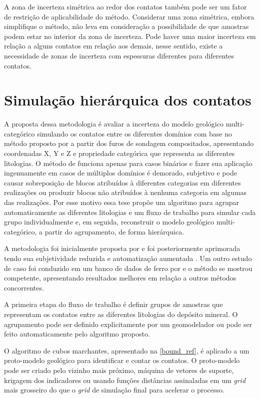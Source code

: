 A zona de incerteza simétrica ao redor dos contatos também pode ser um fator de restrição de aplicabilidade do método. Considerar uma zona simétrica, embora simplifique o método, não leva em consideração a possibilidade de que amostras podem estar no interior da zona de incerteza. Pode haver uma maior incerteza em relação a alguns contatos em relação aos demais, nesse sentido, existe a necessidade de zonas de incerteza com espessuras diferentes para diferentes contatos.

\section{Simulação hierárquica dos contatos}

A proposta dessa metodologia é avaliar a incerteza do modelo geológico multi-categórico simulando os contatos entre os diferentes domínios com base no método proposto por  a partir dos furos de sondagem compositados, apresentando coordenadas X, Y e Z e propriedade categórica que representa as diferentes litologias. O método de  funciona apenas para casos binários e fazer sua aplicação ingenuamente em casos de múltiplos domínios é demorado, subjetivo e pode causar sobreposição de blocos atribuídos à diferentes categorias em diferentes realizações ou produzir blocos não atribuídos à nenhuma categoria em algumas das realizações. Por esse motivo essa tese propõe um algoritmo para agrupar automaticamente as diferentes litologias e um fluxo de trabalho para simular cada grupo individualmente e, em seguida, reconstruir o modelo geológico multi-categórico, a partir do agrupamento, de forma hierárquica. 

A metodologia foi inicialmente proposta por  e foi posteriormente aprimorada tendo sua subjetividade reduzida e automatização aumentada \cite{amarante2021boundary}. Um outro estudo de caso foi conduzido em um banco de dados de ferro por  e o método se mostrou competente, apresentando resultados melhores em relação a outros métodos concorrentes.

A primeira etapa do fluxo de trabalho é definir grupos de amostras que representam os contatos entre as diferentes litologias do depósito mineral. O agrupamento pode ser definido explicitamente por um geomodelador ou pode ser feito automaticamente pelo algoritmo proposto.

O algoritmo de cubos marchantes, apresentado na \autoref{bound_ref}, é aplicado a um proto-modelo geológico para identificar e contar os contatos. O proto-modelo pode ser criado pelo vizinho mais próximo, máquina de vetores de suporte, krigagem dos indicadores ou usando funções distâncias assinaladas em um \textit{grid} mais grosseiro do que o \textit{grid} de simulação final para acelerar o processo.

